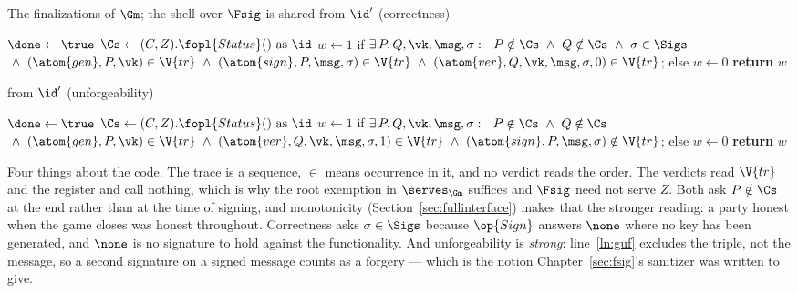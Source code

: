 \documentclass[10pt,oneside,openany]{book}
\theoremstyle{accentdef}
\theoremstyle{accentplain}
\begin{document}
\begin{interface}[nofloat]{The finalizations of $\Gm$; the shell over $\Fsig$ is shared}
 \quad from $\id'$ \quad (correctness)
\begin{algorithmic}[1]
\algcont
\Req{$\neg\done$}
\State $\done \gets \true$
\State $\Cs \gets (C,Z).\fopl{Status}() \text{ as } \id$
\State $w \gets 1$ if $\exists\, P, Q, \vk, \msg, \sigma :\ \
       P \notin \Cs \ \wedge\ Q \notin \Cs \ \wedge\ \sigma \in \Sigs$ \label{ln:gcor}
\State \quad ${}\wedge\ (\atom{gen},P,\vk) \in \V{tr}
       \ \wedge\ (\atom{sign},P,\msg,\sigma) \in \V{tr}
       \ \wedge\ (\atom{ver},Q,\vk,\msg,\sigma,0) \in \V{tr}$;
\State else $w \gets 0$
\State \textbf{return} $w$
\algsave
\end{algorithmic}
\vspace{1.4ex}

 \quad from $\id'$ \quad (unforgeability)
\begin{algorithmic}[1]
\algcont
\Req{$\neg\done$}
\State $\done \gets \true$
\State $\Cs \gets (C,Z).\fopl{Status}() \text{ as } \id$
\State $w \gets 1$ if $\exists\, P, Q, \vk, \msg, \sigma :\ \
       P \notin \Cs \ \wedge\ Q \notin \Cs$ \label{ln:guf}
\State \quad ${}\wedge\ (\atom{gen},P,\vk) \in \V{tr}
       \ \wedge\ (\atom{ver},Q,\vk,\msg,\sigma,1) \in \V{tr}
       \ \wedge\ (\atom{sign},P,\msg,\sigma) \notin \V{tr}$;
\State else $w \gets 0$
\State \textbf{return} $w$
\algsave
\end{algorithmic}
\end{interface}

Four things about the code. The trace is a sequence, $\in$ means occurrence in it, and no verdict
reads the order. The verdicts read $\V{tr}$ and the register and call nothing, which is why
the root exemption in $\serves_{\Gm}$ suffices and $\Fsig$ need not serve $Z$. Both ask
$P \notin \Cs$ at the end rather than at the time of signing, and monotonicity
(Section~\ref{sec:fullinterface}) makes that the stronger reading: a party honest when the game closes
was honest throughout. Correctness asks $\sigma \in \Sigs$ because $\op{Sign}$ answers $\none$ where no
key has been generated, and $\none$ is no signature to hold against the functionality. And
unforgeability is \emph{strong}: line~\ref{ln:guf} excludes the triple, not the message, so a second
signature on a signed message counts as a forgery --- which is the notion
Chapter~\ref{sec:fsig}'s sanitizer was written to give.
\end{document}
